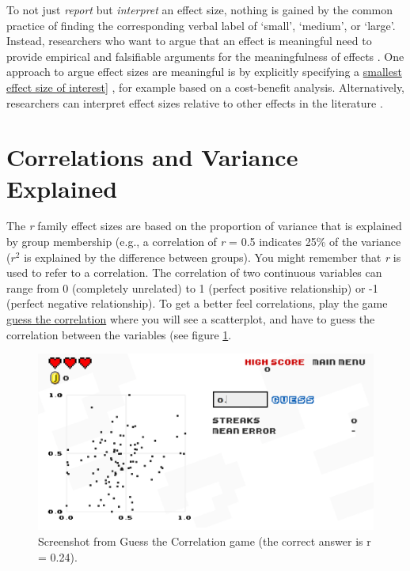 \documentclass[
  oneside]{book}
\begin{document}
To not just \emph{report} but \emph{interpret} an effect size, nothing is gained by the common practice of finding the corresponding verbal label of `small', `medium', or `large'. Instead, researchers who want to argue that an effect is meaningful need to provide empirical and falsifiable arguments for the meaningfulness of effects \citep{primbs_are_2022, anvari_not_2021}. One approach to argue effect sizes are meaningful is by explicitly specifying a \protect\hyperlink{sesoi}{smallest effect size of interest}{]} \citep{gotz_small_2022}, for example based on a cost-benefit analysis. Alternatively, researchers can interpret effect sizes relative to other effects in the literature \citep{baguley_standardized_2009, funder_evaluating_2019}.

\hypertarget{correlations-and-variance-explained}{%
\section{Correlations and Variance Explained}\label{correlations-and-variance-explained}}

The \emph{r} family effect sizes are based on the proportion of variance that is explained by group membership (e.g., a correlation of \emph{r} = 0.5 indicates 25\% of the variance (\(r^2\) is explained by the difference between groups). You might remember that \emph{r} is used to refer to a correlation. The correlation of two continuous variables can range from 0 (completely unrelated) to 1 (perfect positive relationship) or -1 (perfect negative relationship). To get a better feel correlations, play the game \href{http://guessthecorrelation.com/}{guess the correlation} where you will see a scatterplot, and have to guess the correlation between the variables (see figure \ref{fig:guesscorrelation}.

\begin{figure}

{\centering \includegraphics[width=1\linewidth]{images/guesscorrelation} 

}

\caption{Screenshot from Guess the Correlation game (the correct answer is r = 0.24).}\label{fig:guesscorrelation}
\end{figure}
\end{document}
